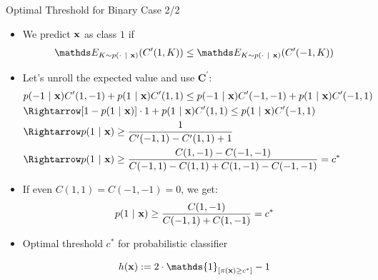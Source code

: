 \documentclass[11pt,compress,t,notes=noshow, xcolor=table]{beamer}
\begin{document}
\begin{frame}{Optimal Threshold for Binary Case 2/2}
            \begin{itemize}
            \item We predict $\mathbf{x}$ as class $1$ if 
            \begin{align*}
                \E_{K \sim p(\cdot ~|~ \xv)}( C^\prime(1,K) )  \leq \E_{K \sim p(\cdot ~|~ \xv)}( C^\prime(-1,K) ) \\
            \end{align*}

			\item Let's unroll the expected value and use $\mathbf{C}^\prime$:
            \footnotesize{
    			\begin{align*}	
                    & p(-1 ~|~ \xv ) C^\prime(1,-1)  + 	p(1 ~|~ \xv ) C^\prime(1,1) \leq  p(-1 ~|~ \xv ) C^\prime(-1,-1)  + 	p(1 ~|~ \xv ) C^\prime(-1,1)  \\ 
                    &\Rightarrow [1 - p(1 ~|~ \xv)] \cdot 1 + p(1 ~|~ \xv) C^\prime(1, 1) \leq p(1 ~|~ \xv) C^\prime(-1, 1) \\
                    &\Rightarrow p(1 ~|~ \xv) \geq \frac{1}{C^\prime(-1, 1) - C^\prime(1, 1) + 1} \\
                    &\Rightarrow p(1 ~|~ \xv) \geq \frac{C(1, -1) - C(-1, -1)}{C(-1, 1) - C(1, 1) + C(1, -1) - C(-1, -1)} = c^*
    			\end{align*}
            }
		
            \item If even $C(1, 1) = C(-1, -1) = 0 $, we get:
            \begin{align*}
                p(1 ~|~ \mathbf{x}) \geq \frac{C(1, -1)}{C(-1, 1) + C(1, -1)} = c^{*}
            \end{align*}	
            
            \item Optimal threshold $c^*$ for probabilistic classifier 
            
            $$   \hx := 2 \cdot \mathds{1}_{[ \pi(\xv) \geq c^*]} -1 $$
							
		\end{itemize}
\end{frame}
\end{document}
